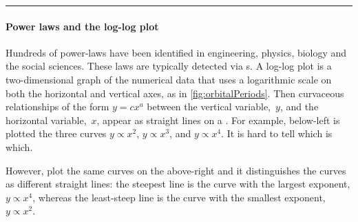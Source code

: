 \begin{table}
\hrule
\begin{minipage}{\linewidth}
\paragraph{Power laws and the log-log plot}
Hundreds of power-laws have been identified in engineering, physics, biology and the social sciences.
These laws are typically detected via s.
A log-log plot is a two-dimensional graph of the numerical data that uses a logarithmic scale on both the horizontal and vertical axes, as in \cref{fig:orbitalPeriods}.
Then curvaceous relationships of the form $y=cx^a$ between the vertical variable,~$y$, and the horizontal variable,~$x$, appear as straight lines on a .
For example, below-left is plotted the three curves $y\propto x^2$,  $y\propto x^3$, and  $y\propto x^4$.
It is hard to tell which is which.
\begin{center} 
 \hfil
{} 
\end{center}
However, plot the same curves on the above-right  and it  distinguishes the curves as different straight lines: the steepest line is the curve with the largest exponent, $y\propto x^4$, whereas the least-steep line is the curve with the smallest exponent, $y\propto x^2$.


\end{minipage}
\end{table}
